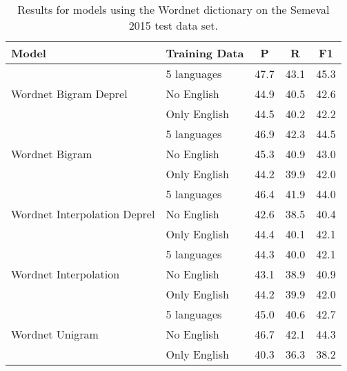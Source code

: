 \begin{table}[]
    \centering
\begin{tabular}{llccc}
\textbf{Model}  & \textbf{Training Data} & \textbf{P}     & \textbf{R}    & \textbf{F1}  \\
\hline
\multirow{3}{*}{ Wordnet Bigram Deprel
 }       & 5 languages   & 47.7  & 43.1  & 45.3    \\
                                                & No English    & 44.9  & 40.5  & 42.6    \\
                                                & Only English  & 44.5  & 40.2  & 42.2    \\
\hline
\multirow{3}{*}{ Wordnet Bigram }               & 5 languages   & 46.9  & 42.3  & 44.5    \\
                                                & No English    & 45.3  & 40.9  & 43.0    \\
                                                & Only English  & 44.2  & 39.9  & 42.0    \\
\hline
\multirow{3}{*}{ Wordnet Interpolation Deprel } & 5 languages   & 46.4  & 41.9  & 44.0    \\
                                                & No English    & 42.6  & 38.5  & 40.4    \\
                                                & Only English  & 44.4  & 40.1  & 42.1    \\
\hline
\multirow{3}{*}{ Wordnet Interpolation
 }       & 5 languages   & 44.3  & 40.0  & 42.1    \\
                                                & No English    & 43.1  & 38.9  & 40.9    \\
                                                & Only English  & 44.2  & 39.9  & 42.0    \\
\hline
\multirow{3}{*}{ Wordnet Unigram }              & 5 languages   & 45.0  & 40.6  & 42.7    \\
                                                & No English    & 46.7  & 42.1  & 44.3    \\
                                                & Only English  & 40.3  & 36.3  & 38.2    \\
\end{tabular}
    \caption{Results for models using the Wordnet dictionary on the Semeval 2015 test data set.}
    \label{tab:wordnet_semeval}
\end{table}

